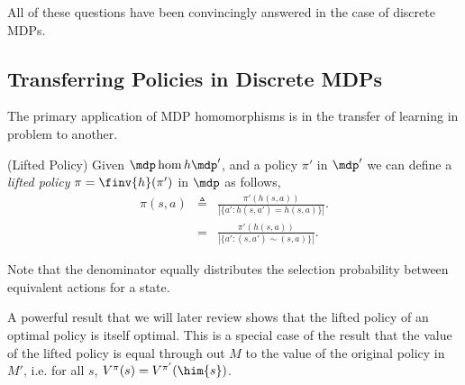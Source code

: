 All of these questions have been convincingly answered in the case of
discrete MDPs. 

\subsection{Transferring Policies in Discrete MDPs}

The primary application of MDP homomorphisms is in the transfer of
learning in problem to another. 

\begin{definition}(Lifted Policy)
  Given $\mdp \hom{h} \mdp'$, and a policy $\pi'$ in $\mdp'$ we can
  define a {\em lifted policy} $\pi = \finv{h}(\pi')$ in $\mdp$ as
  follows,
  \begin{eqnarray}
    \pi(s,a) &\triangleq& \frac{\pi'(h(s,a))}{ |\{a':h(s,a') = h(s,a)\}| }. \\
             &=& \frac{\pi'(h(s,a))}{ |\{a':(s,a') \sim (s,a)\}| }.
  \end{eqnarray}

  Note that the denominator equally distributes the selection
  probability between equivalent actions for a state.
\end{definition}

A powerful result that we will later review shows that the lifted
policy of an optimal policy is itself optimal. This is a special case
of the result that the value of the lifted policy is equal through out
$M$ to the value of the original policy in $M'$, i.e. for all $s$,
$V^{\pi}(s) = V^{\pi'}(\him{s})$.

